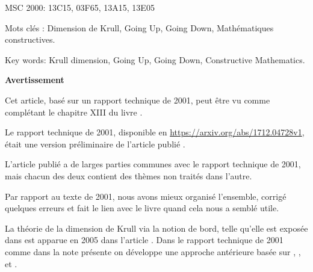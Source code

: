 \begin{abstract}
Nous rappelons des versions \covs de la théorie de la dimension de Krull 
dans les anneaux commutatifs et dans les \trdis, dont les bases ont 
été posées par Joyal, Espan\~ol et les deux auteurs. Nous montrons 
sur les exemples de la dimension des algèbres \pf, du Going Up, du 
Going Down, 
\ldots\ que cela nous permet de donner une version \cov de 
théorèmes classiques importants, et par conséquent de récupérer un contenu 
calculatoire explicite lorsque ces théorèmes abstraits sont utilisés 
pour démontrer l'existence d'objets concrets. Nous pensons ainsi mettre 
en oeuvre une réalisation partielle du programme de Hilbert pour 
l'algèbre abstraite classique.  
\end{abstract}
\mni MSC 2000: 13C15, 03F65, 13A15, 13E05

\mni Mots clés :  Dimension de Krull, Going Up, Going Down,  
Mathématiques constructives.

\mni Key words: Krull dimension, Going Up, Going Down,  
Constructive Mathematics.


\vspace{2em} \centerline{\bf Avertissement}

\medskip  Cet article, basé sur un rapport technique de 2001, peut être vu comme complétant le chapitre XIII du livre \cite{ACMC}. 

Le rapport technique de 2001, disponible en \url{https://arxiv.org/abs/1712.04728v1}, était une version préliminaire de l'article publié \cite[Coquand \& Lombardi, 2003]{cl03} \url{}. 

L'article publié \cite{cl03}
a de larges parties communes avec le rapport technique de 2001, mais chacun des deux contient des thèmes non traités dans l'autre.

Par rapport au texte de 2001, nous avons mieux organisé l'ensemble, corrigé quelques erreurs et fait le lien avec le livre \cite{ACMC} quand cela nous a semblé utile.

La théorie \cov de la dimension de Krull via la notion de bord, telle qu'elle est exposée dans \cite{ACMC} est apparue en 2005 dans l'article \cite[Coquand, Lombardi, Roy]{clr05}. Dans le rapport technique de 2001 comme dans la note présente on développe une approche antérieure basée sur \cite[Joyal]{joy71}, \cite[Español]{esp}, \cite[Lombardi]{lom} et \cite[Cederquist, Coquand]{cc}.  

